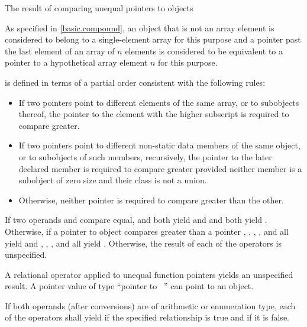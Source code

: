 \pnum
The result of comparing unequal pointers to objects
\begin{footnote}
As specified in \ref{basic.compound},
an object that is not an array element
is considered to belong to a
single-element array for this purpose and
a pointer past the last element of an array of $n$ elements
is considered to be equivalent to a pointer to a hypothetical array element
$n$ for this purpose.
\end{footnote}
is defined in terms of a partial order consistent with the following rules:

\begin{itemize}
\item If two pointers point to different elements of the same array, or to
subobjects thereof, the pointer to the element with the higher subscript
is required to compare greater.

\item If two pointers point to different non-static data members of the same
object, or to subobjects of such members, recursively,
the pointer to the later declared member is required to compare greater provided
neither member is a subobject of zero size
and their class is not a union.

\item Otherwise, neither pointer is required to compare greater than the other.

\end{itemize}

\pnum
If two operands  and  compare equal,
 and  both yield  and  and
 both yield . Otherwise, if a pointer to object 
compares greater than a pointer , , ,
, and  all yield  and ,
, , and  all yield .
Otherwise, the result of each of the operators is unspecified.
\begin{note}
A relational operator applied
to unequal function pointers
yields an unspecified result.
A pointer value of type ``pointer to \cv{}~''
can point to an object.
\end{note}

\pnum
If both operands (after conversions) are of arithmetic or enumeration type, each
of the operators shall yield  if the specified relationship is true
and  if it is false.

